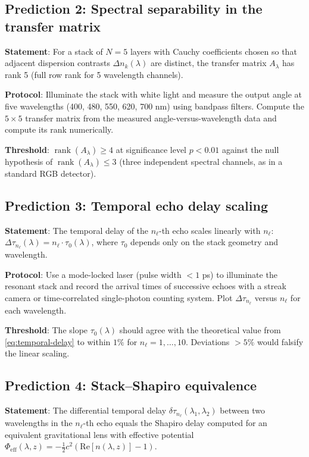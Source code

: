 \documentclass[11pt,twocolumn,a4paper]{article}
\theoremstyle{plain}
\theoremstyle{definition}
\theoremstyle{remark}
\DeclareMathOperator{\rank}{rank}
\newcommand{\half}{\tfrac{1}{2}}
\begin{document}
\subsection{Prediction 2: Spectral separability in the transfer matrix}

\textbf{Statement}: For a stack of $N=5$ layers with Cauchy coefficients chosen so that adjacent dispersion contrasts $\Delta n_k(\lambda)$ are distinct, the transfer matrix $A_\lambda$ has rank 5 (full row rank for 5 wavelength channels).

\textbf{Protocol}: Illuminate the stack with white light and measure the output angle at five wavelengths (400, 480, 550, 620, 700 nm) using bandpass filters. Compute the $5\times 5$ transfer matrix from the measured angle-versus-wavelength data and compute its rank numerically.

\textbf{Threshold}: $\rank(A_\lambda)\geq 4$ at significance level $p<0.01$ against the null hypothesis of $\rank(A_\lambda)\leq 3$ (three independent spectral channels, as in a standard RGB detector).

\subsection{Prediction 3: Temporal echo delay scaling}

\textbf{Statement}: The temporal delay of the $n_\ell$-th echo scales linearly with $n_\ell$: $\Delta\tau_{n_\ell}(\lambda)=n_\ell\cdot\tau_0(\lambda)$, where $\tau_0$ depends only on the stack geometry and wavelength.

\textbf{Protocol}: Use a mode-locked laser (pulse width $<1$ ps) to illuminate the resonant stack and record the arrival times of successive echoes with a streak camera or time-correlated single-photon counting system. Plot $\Delta\tau_{n_\ell}$ versus $n_\ell$ for each wavelength.

\textbf{Threshold}: The slope $\tau_0(\lambda)$ should agree with the theoretical value from \eqref{eq:temporal-delay} to within $1\%$ for $n_\ell=1,\ldots,10$. Deviations $>5\%$ would falsify the linear scaling.

\subsection{Prediction 4: Stack--Shapiro equivalence}

\textbf{Statement}: The differential temporal delay $\delta\tau_{n_\ell}(\lambda_1,\lambda_2)$ between two wavelengths in the $n_\ell$-th echo equals the Shapiro delay computed for an equivalent gravitational lens with effective potential $\Phi_\text{eff}(\lambda,z)=-\half c^2(\mathrm{Re}[n(\lambda,z)]-1)$.
\end{document}
